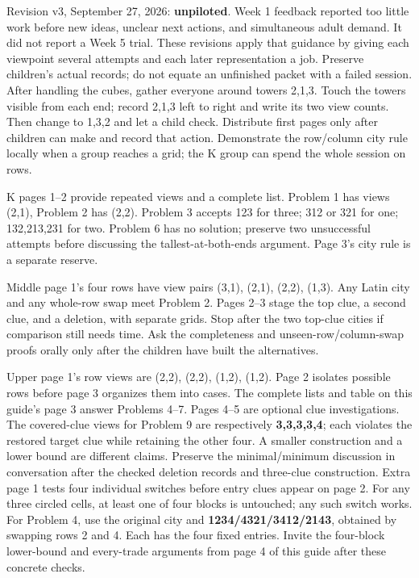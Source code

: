 \documentclass[11pt]{article}
\begin{document}
\newpage
{}
Revision v3, September 27, 2026: \textbf{unpiloted}. Week 1 feedback reported too little work before new ideas, unclear next actions, and simultaneous adult demand. It did not report a Week 5 trial. These revisions apply that guidance by giving each viewpoint several attempts and each later representation a job. Preserve children's actual records; do not equate an unfinished packet with a failed session.
After handling the cubes, gather everyone around towers 2,1,3. Touch the towers visible from each end; record 2,1,3 left to right and write its two view counts. Then change to 1,3,2 and let a child check. Distribute first pages only after children can make and record that action. Demonstrate the row/column city rule locally when a group reaches a grid; the K group can spend the whole session on rows.

K pages 1--2 provide repeated views and a complete list. Problem 1 has views (2,1), Problem 2 has (2,2). Problem 3 accepts 123 for three; 312 or 321 for one; 132,213,231 for two. Problem 6 has no solution; preserve two unsuccessful attempts before discussing the tallest-at-both-ends argument. Page 3's city rule is a separate reserve.

Middle page 1's four rows have view pairs (3,1), (2,1), (2,2), (1,3). Any Latin city and any whole-row swap meet Problem 2. Pages 2--3 stage the top clue, a second clue, and a deletion, with separate grids. Stop after the two top-clue cities if comparison still needs time. Ask the completeness and unseen-row/column-swap proofs orally only after the children have built the alternatives.

Upper page 1's row views are (2,2), (2,2), (1,2), (1,2). Page 2 isolates possible rows before page 3 organizes them into cases. The complete lists and table on this guide's page 3 answer Problems 4--7. Pages 4--5 are optional clue investigations. The covered-clue views for Problem 9 are respectively \textbf{3,3,3,3,4}; each violates the restored target clue while retaining the other four. A smaller construction and a lower bound are different claims. Preserve the minimal/minimum discussion in conversation after the checked deletion records and three-clue construction.
Extra page 1 tests four individual switches before entry clues appear on page 2. For any three circled cells, at least one of four blocks is untouched; any such switch works. For Problem 4, use the original city and \textbf{1234/4321/3412/2143}, obtained by swapping rows 2 and 4. Each has the four fixed entries. Invite the four-block lower-bound and every-trade arguments from page 4 of this guide after these concrete checks.
\end{document}
